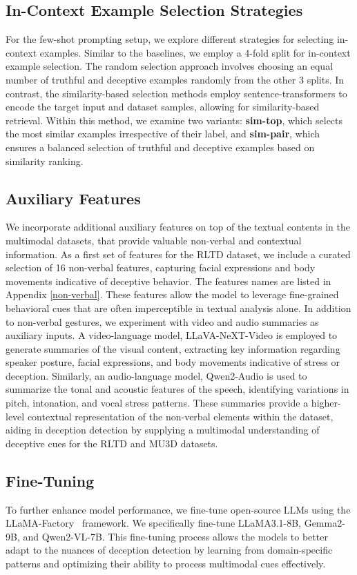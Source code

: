 \subsection{In-Context Example Selection Strategies}
For the few-shot prompting setup, we explore different strategies for selecting in-context examples. Similar to the baselines, we employ a 4-fold split for in-context example selection. The random selection approach involves choosing an equal number of truthful and deceptive examples randomly from the other 3 splits. In contrast, the similarity-based selection methods employ sentence-transformers to encode the target input and dataset samples, allowing for similarity-based retrieval. Within this method, we examine two variants: \textbf{sim-top}, which selects the most similar examples irrespective of their label, and \textbf{sim-pair}, which ensures a balanced selection of truthful and deceptive examples based on similarity ranking.

\subsection{Auxiliary Features}
We incorporate additional auxiliary features on top of the textual contents in the multimodal datasets, that provide valuable non-verbal and contextual information. As a first set of features for the RLTD dataset, we include a curated selection of 16 non-verbal features, capturing facial expressions and body movements indicative of deceptive behavior. The features names are listed in Appendix \ref{non-verbal}.  These features allow the model to leverage fine-grained behavioral cues that are often imperceptible in textual analysis alone. In addition to non-verbal gestures, we experiment with video and audio summaries as auxiliary inputs. A video-language model, LLaVA-NeXT-Video is employed to generate summaries of the visual content, extracting key information regarding speaker posture, facial expressions, and body movements indicative of stress or deception. Similarly, an audio-language model, Qwen2-Audio is used to summarize the tonal and acoustic features of the speech, identifying variations in pitch, intonation, and vocal stress patterns. These summaries provide a higher-level contextual representation of the non-verbal elements within the dataset, aiding in deception detection by supplying a multimodal understanding of deceptive cues for the RLTD and MU3D datasets.

\subsection{Fine-Tuning}
To further enhance model performance, we fine-tune open-source LLMs using the LLaMA-Factory~\cite{llamafactory} framework. We specifically fine-tune LLaMA3.1-8B, Gemma2-9B, and Qwen2-VL-7B. This fine-tuning process allows the models to better adapt to the nuances of deception detection by learning from domain-specific patterns and optimizing their ability to process multimodal cues effectively. 



